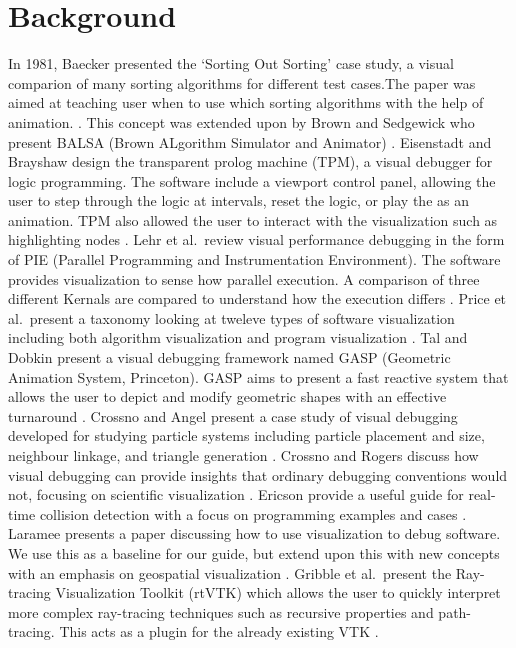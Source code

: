 \section{Background}
In 1981, Baecker presented the `Sorting Out Sorting' case study, a visual comparion of many sorting algorithms for different test cases.The paper was aimed at teaching user when to use which sorting algorithms with the help of animation. \cite{baecker1981sorting, baecker1998sorting}. This concept was extended upon by Brown and Sedgewick who present BALSA (Brown ALgorithm Simulator and Animator) \cite{brown1984system}.
Eisenstadt and Brayshaw design the transparent prolog machine (TPM), a visual debugger for logic programming. The software include a viewport control panel, allowing the user to step through the logic at intervals, reset the logic, or play the as an animation. TPM also allowed the user to interact with the visualization such as highlighting nodes \cite{eisenstadt1988transparent}. 
Lehr et al.\ review visual performance debugging in the form of PIE (Parallel Programming and Instrumentation Environment). The software provides visualization to sense how parallel execution. A comparison of three different Kernals are compared to understand how the execution differs \cite{lehr1989visualizing}.
Price et al.\ present a taxonomy looking at tweleve types of software visualization including both algorithm visualization and program visualization \cite{price1993principled}.
Tal and Dobkin present a visual debugging framework named GASP (Geometric Animation System, Princeton). GASP aims to present a fast reactive system that allows the user to depict and modify geometric shapes with an effective turnaround \cite{tal1995visualization}.
Crossno and Angel present a case study of visual debugging developed for studying particle systems including particle placement and size, neighbour linkage, and triangle generation \cite{crossno1999visual}.
Crossno and Rogers discuss how visual debugging can provide insights that ordinary debugging conventions would not, focusing on scientific visualization \cite{crossno2002visual}.
Ericson provide a useful guide for real-time collision detection with a focus on programming examples and cases \cite{ericson2004real}.
Laramee presents a paper discussing how to use visualization to debug software. We use this as a baseline for our guide, but extend upon this with new concepts with an emphasis on geospatial visualization \cite{laramee2009using}.
Gribble et al.\ present the Ray-tracing Visualization Toolkit (rtVTK) which allows the user to quickly interpret more complex ray-tracing techniques such as recursive properties and path-tracing. This acts as a plugin for the already existing VTK \cite{gribble2012ray}.
